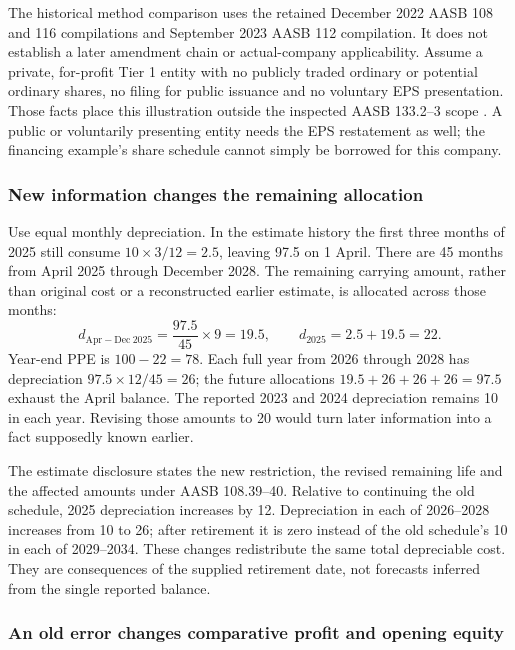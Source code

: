 The historical method comparison uses the retained December 2022 AASB 108
and 116 compilations and September 2023 AASB 112 compilation. It does not
establish a later amendment chain or actual-company applicability. Assume
a private, for-profit Tier 1 entity with no publicly traded ordinary or
potential ordinary shares, no filing for public issuance and no voluntary
EPS presentation. Those facts place this illustration outside the inspected
AASB 133.2--3 scope \citep{aasb133scope2021}. A public or voluntarily
presenting entity needs the EPS restatement as well; the financing example's
share schedule cannot simply be borrowed for this company.

\subsubsection{New information changes the remaining allocation}

Use equal monthly depreciation. In the estimate history the first three
months of 2025 still consume \(10\times3/12=2.5\), leaving 97.5 on
1 April. There are 45 months from April 2025 through December 2028. The
remaining carrying amount, rather than original cost or a reconstructed
earlier estimate, is allocated across those months:
\[
 d_{\mathrm{Apr-Dec\ 2025}}=\frac{97.5}{45}\times9=19.5,
 \qquad d_{2025}=2.5+19.5=22.
\]
Year-end PPE is \(100-22=78\). Each full year from 2026 through 2028
has depreciation \(97.5\times12/45=26\); the future allocations
\(19.5+26+26+26=97.5\) exhaust the April balance. The reported 2023
and 2024 depreciation remains 10 in each year. Revising those amounts to
20 would turn later information into a fact supposedly known earlier.

The estimate disclosure states the new restriction, the revised remaining
life and the affected amounts under AASB 108.39--40. Relative to continuing
the old schedule, 2025 depreciation increases by 12. Depreciation in each of
2026--2028 increases from 10 to 26; after retirement it is zero instead of
the old schedule's 10 in each of 2029--2034. These changes redistribute the
same total depreciable cost. They are consequences of the supplied retirement
date, not forecasts inferred from the single reported balance.

\subsubsection{An old error changes comparative profit and opening equity}

